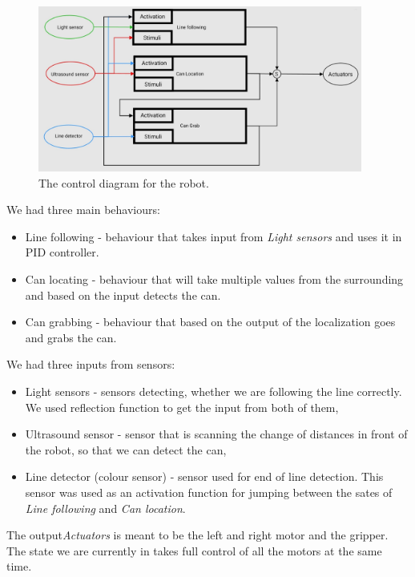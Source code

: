 \documentclass{article}
\begin{document}
\begin{figure}[hpbt!]
	\begin{center}
		\includegraphics[width=0.95\textwidth]{"./figures/ControlDiagram.jpeg"}
	\end{center}
	\caption{The control diagram for the robot.}
	\label{fig:controlDiagram}
\end{figure}

We had three main behaviours:
\begin{itemize}
	\item Line following - behaviour that takes input from \textit{Light sensors} and uses it in PID controller.
	\item Can locating - behaviour that will take multiple values from the surrounding and based on the input
						 detects the can.
	\item Can grabbing - behaviour that based on the output of the localization goes and grabs the can.
\end{itemize}

We had three inputs from sensors:
\begin{itemize}
	\item Light sensors - sensors detecting, whether we are following the line correctly. We used reflection function
		  to get the input from both of them,
	\item Ultrasound sensor - sensor that is scanning the change of distances in front of the robot, so that we can
		  detect the can,
	\item Line detector (colour sensor) - sensor used for end of line detection. This sensor was used as an activation
		  function for jumping between the sates of \textit{Line following} and \textit{Can location}.
\end{itemize}

The output\textit{Actuators} is meant to be the left and right motor and the gripper. The state we are currently in takes
full control of all the motors at the same time.
\end{document}
